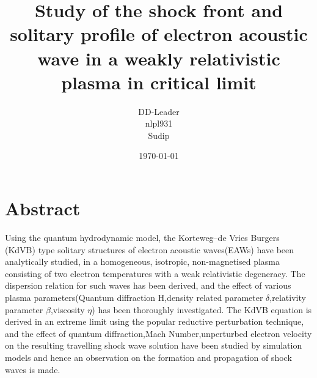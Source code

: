 \documentclass[a4paper, 12pt]{article}
\begin{document}
\title{Study of the shock front and solitary profile of electron acoustic wave in a weakly relativistic plasma in critical limit}
\author{DD-Leader\\nlpl931\\Sudip}
\date{\today}
\maketitle
\newpage
\section{Abstract}
\label{Abstract}
Using the quantum hydrodynamic model, the Korteweg–de Vries Burgers (KdVB) type solitary structures of electron acoustic waves(EAWs) have been analytically studied, in a homogeneous, isotropic, non-magnetised plasma consisting of two electron temperatures with a weak relativistic degeneracy. The dispersion relation for such waves has been derived, and the effect of various plasma parameters(Quantum diffraction H,density related parameter $\delta$,relativity parameter $\beta$,viscosity $\eta$) has been thoroughly investigated. The KdVB equation is derived in an extreme limit using the popular reductive perturbation technique, and the effect of quantum diffraction,Mach Number,unperturbed electron velocity on the resulting travelling shock wave solution have been studied by simulation models and hence an observation on the formation and propagation of shock waves is made.
\newpage %
\tableofcontents %
\newpage
\end{document}
